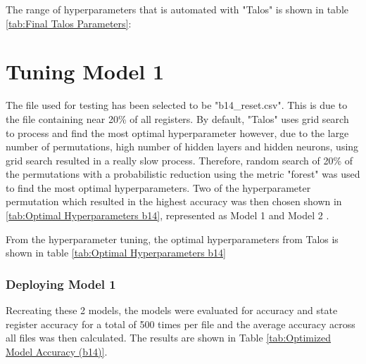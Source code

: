 \documentclass{tum-book}
\begin{document}
    
    \bigskip\noindent
    The range of hyperparameters that is automated with "Talos" is shown in table \ref{tab:Final Talos Parameters}:
    
            \begin{table}[ht]
            \centering
            
            \end{table}
            
            
    \section{Tuning Model 1}\label{section:tuning b14}
    The file used for testing has been selected to be "b14\_reset.csv". This is due to the file containing near 20\% of all registers. By default, "Talos" uses grid search to process and find the most optimal hyperparameter however, due to the large number of permutations, high number of hidden layers and hidden neurons, using grid search resulted in a really slow process. Therefore, random search of 20\% of the permutations with a probabilistic reduction using the metric "forest" was used to find the most optimal hyperparameters. Two of the hyperparameter permutation which resulted in the highest accuracy was then chosen shown in \ref{tab:Optimal Hyperparameters b14}, represented as Model 1 and Model 2 .
        
    \bigskip\noindent
    From the hyperparameter tuning, the optimal hyperparameters from Talos is shown in table \ref{tab:Optimal Hyperparameters b14}
    
        \begin{table}[ht]
            \centering
            
        \end{table}
    
    \newpage\subsubsection{Deploying Model 1}
    Recreating these 2 models, the models were evaluated for accuracy and state register accuracy for a total of 500 times per file and the average accuracy across all files was then calculated. The results are shown in Table \ref{tab:Optimized Model Accuracy (b14)}.
            
        \begin{table}[ht]
            \centering
            
        \end{table}
        
\end{document}
